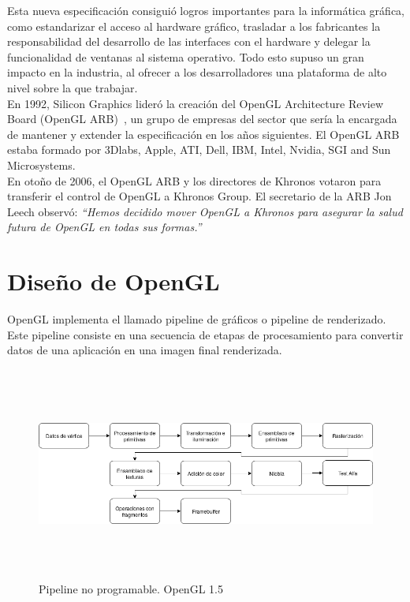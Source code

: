 Esta nueva especificación consiguió logros importantes para la informática gráfica,
como estandarizar el acceso al hardware gráfico, trasladar a los fabricantes la
responsabilidad del desarrollo de las interfaces con el hardware y delegar la
funcionalidad de ventanas al sistema operativo. Todo esto supuso un gran impacto
en la industria, al ofrecer a los desarrolladores una plataforma de alto nivel
sobre la que trabajar.\\

En 1992, Silicon Graphics lideró la creación del OpenGL Architecture Review
Board (OpenGL ARB)~\cite{OpenGLARB}, un grupo de empresas del sector que sería la encargada de
mantener y extender la especificación en los años siguientes. El OpenGL ARB
estaba formado por 3Dlabs, Apple, ATI, Dell, IBM, Intel, Nvidia, SGI and Sun
Microsystems.\\

En otoño de 2006, el OpenGL ARB y los directores de Khronos votaron para transferir el
control de OpenGL a Khronos Group. El secretario de la ARB Jon Leech observó:
\textit{``Hemos decidido mover OpenGL a Khronos para asegurar la salud futura de
OpenGL en todas sus formas.''}~\cite{OpenGLARB}

\section{Diseño de OpenGL}
\label{makereference2.3}

OpenGL implementa el llamado pipeline de gráficos o pipeline de renderizado.
Este pipeline consiste en una secuencia de etapas de procesamiento para
convertir datos de una aplicación en una imagen final renderizada. \\

\begin{figure}[h]
		\centering
		\includegraphics[height=7cm,width=\textwidth]{figures/pipelinefijo.png}
		\caption{Pipeline no programable. OpenGL 1.5}
		\label{fig2.1}
\end{figure}

